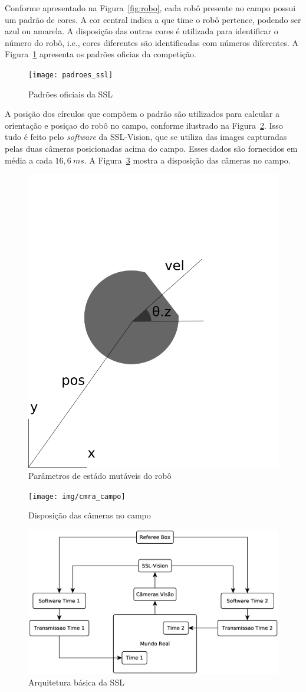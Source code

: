 Conforme apresentado na Figura~\ref{fig:robo}, cada robô presente no campo
possui um padrão de cores.  A cor central indica a que time o robô pertence,
podendo ser azul ou amarela.  A disposição das outras cores é utilizada para
identificar o número do robô, i.e., cores diferentes são identificadas com
números diferentes.  A Figura~\ref{fig:padroes_ssl} apresenta os padrões oficias
da competição.

\begin{figure}[thpb]
  \centering
  \texttt{[image: padroes\_ssl]}
  \caption{Padrões oficiais da SSL~\cite{zickler-ssl}}\label{fig:padroes_ssl}
\end{figure}

A posição dos círculos que compõem o padrão são utilizados para calcular a
orientação e posiçao do robô no campo, conforme ilustrado na
Figura~\ref{fig:rob_data}.  Isso tudo é feito pelo \textit{software} da
SSL-Vision, que se utiliza das images capturadas pelas duas câmeras posicionadas
acima do campo.  Esses dados são fornecidos em média a cada $16,6{\ }ms$.  A
Figura~\ref{fig:cmra_campo} mostra a disposição das câmeras no campo.

\begin{figure}[thpb]
  \centering
  \includegraphics[width=0.5\linewidth]{img/rob_data}
  \caption{Parâmetros de estádo mutáveis do robô}\label{fig:rob_data}
\end{figure}

\begin{figure}[thpb]
  \centering
  \texttt{[image: img/cmra\_campo]}
  \caption{Disposição das câmeras no campo}\label{fig:cmra_campo}
\end{figure}

\begin{figure}[thpb]
  \centering
  \includegraphics[width= 0.8\linewidth]{img/arq_ssl}
  \caption{Arquitetura básica da SSL}\label{fig:arquitetura_ssl}
\end{figure}

